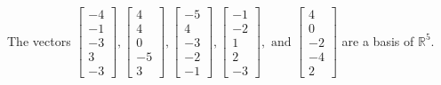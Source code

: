 \begin{exercise}
\begin{exerciseStatement}
  \end{exerciseStatement}
  \begin{exerciseAnswer}
   The vectors \(\left[\begin{array}{r}
-4 \\
-1 \\
-3 \\
3 \\
-3
\end{array}\right] , \left[\begin{array}{r}
4 \\
4 \\
0 \\
-5 \\
3
\end{array}\right] , \left[\begin{array}{r}
-5 \\
4 \\
-3 \\
-2 \\
-1
\end{array}\right] , \left[\begin{array}{r}
-1 \\
-2 \\
1 \\
2 \\
-3
\end{array}\right] , \text{ and } \left[\begin{array}{r}
4 \\
0 \\
-2 \\
-4 \\
2
\end{array}\right]\) 
  	 are  a basis of \(\mathbb{R}^5\).
  


  \end{exerciseAnswer}
\end{exercise}
